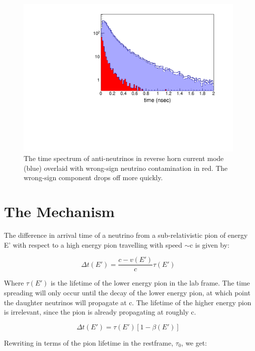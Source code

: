 \documentclass[preprint,12pt]{elsarticle}
\begin{document}
\begin{figure}[t]
	\begin{center}
           	\includegraphics[width=0.8 \linewidth]{Figures/2018.11.07_LBNFtimingRHC/RHCbeamcontent_log.pdf}
	\end{center}
	\caption{The time spectrum of anti-neutrinos in reverse horn current mode (blue) overlaid with wrong-sign neutrino contamination in red. The wrong-sign component drops off more quickly.}
		\label{fig:anniedetector}
\end{figure}

\section{The Mechanism}

The difference in arrival time of a neutrino from a sub-relativistic pion of energy E' with respect to a high energy pion travelling with speed $\sim$c is given by:

\begin{equation}
\Delta t(E') = \frac{c - v(E')}{c} \tau (E')
\end{equation}

Where $\tau (E')$ is the lifetime of the lower energy pion in the lab frame. The time spreading will only occur until the decay of the lower energy pion, at which point the daughter neutrinos will propagate at c. The lifetime of the higher energy pion is irrelevant, since the pion is already propagating at roughly c.

\begin{equation}
\Delta t(E') = \tau (E') [1 - \beta (E')]
\end{equation}

Rewriting in terms of the pion lifetime in the restframe, $\tau_0$, we get:
\end{document}
